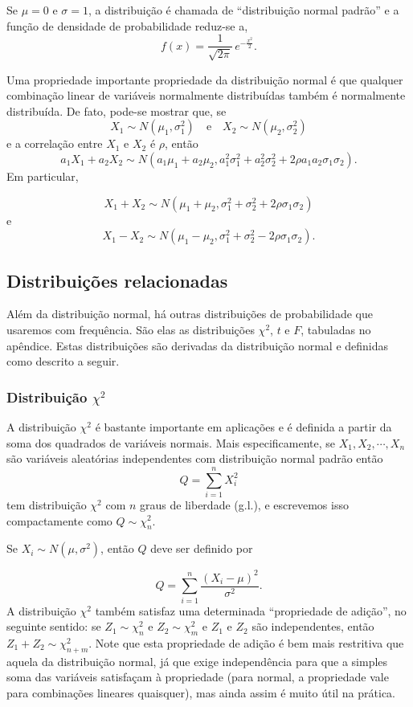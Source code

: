 \documentclass[
]{book}
\theoremstyle{definition}
\theoremstyle{definition}
\theoremstyle{definition}
\theoremstyle{remark}
\begin{document}
Se \(\mu = 0\) e \(\sigma = 1\), a distribuição é chamada de ``distribuição normal padrão''
e a função de densidade de probabilidade reduz-se a,
\[f(x) = \frac{1}{\sqrt{2\pi}} \, e^{-\frac{x^2}{2}}.\]

Uma propriedade importante propriedade da distribuição normal é que qualquer
combinação linear de variáveis normalmente distribuídas também é
normalmente distribuída. De fato, pode-se mostrar que, se
\[X_1 \sim N(\mu_1,\sigma^2_1)
\quad \mbox{e} \quad X_2 \sim N(\mu_2,\sigma^2_2)\]
e a correlação entre \(X_1\) e \(X_2\) é \(\rho\), então
\[a_1X_1+a_2X_2 \sim N(a_1\mu_1+a_2\mu_2, a_1^2\sigma^2_1+a_2^2\sigma^2_2+2\rho
a_1a_2\sigma_1\sigma_2).\]
Em particular,

\[X_1+X_2 \sim N(\mu_1+\mu_2, \sigma^2_1+\sigma^2_2+2\rho \sigma_1\sigma_2)\]
e
\[X_1-X_2 \sim N(\mu_1-\mu_2, \sigma^2_1+\sigma^2_2-2\rho \sigma_1\sigma_2).\]

\hypertarget{distribuiuxe7uxf5es-relacionadas}{%
\subsection{Distribuições relacionadas}\label{distribuiuxe7uxf5es-relacionadas}}

Além da distribuição normal, há outras distribuições de probabilidade que usaremos com frequência. São elas as distribuições \(\chi^2\), \(t\) e \(F\), tabuladas no apêndice. Estas distribuições são derivadas da distribuição normal e definidas como descrito a seguir.

\hypertarget{distribuiuxe7uxe3o-chi2}{%
\subsubsection{\texorpdfstring{Distribuição \(\chi^2\)}{Distribuição \textbackslash chi\^{}2}}\label{distribuiuxe7uxe3o-chi2}}

A distribuição \(\chi^2\) é bastante importante em aplicações e é definida a partir da soma dos quadrados de variáveis normais. Mais especificamente, se \(X_1, X_2, \cdots, X_n\) são variáveis aleatórias independentes com distribuição normal padrão então
\[Q=\sum_{i=1}^n X_i^2\]
tem distribuição \(\chi^2\) com \(n\) graus de liberdade (g.l.), e escrevemos isso compactamente como \(Q \sim \chi_n^2\).

Se \(X_i \sim N(\mu, \sigma^2)\), então \(Q\) deve ser definido por

\[Q=\sum_{i=1}^n \frac{(X_i-\mu)^2}{\sigma^2}.\]
A distribuição \(\chi^2\) também satisfaz uma determinada ``propriedade de adição'',
no seguinte sentido: se \(Z_1 \sim \chi_n^2\) e \(Z_2 \sim \chi_m^2\) e \(Z_1\) e \(Z_2\) são
independentes, então \(Z_1+Z_2 \sim \chi^2_{n+m}\). Note que esta propriedade de adição é bem mais restritiva que aquela da distribuição normal, já que exige independência para que a simples soma das variáveis satisfaçam à propriedade (para normal, a propriedade vale para combinações lineares quaisquer), mas ainda assim é muito útil na prática.
\end{document}

